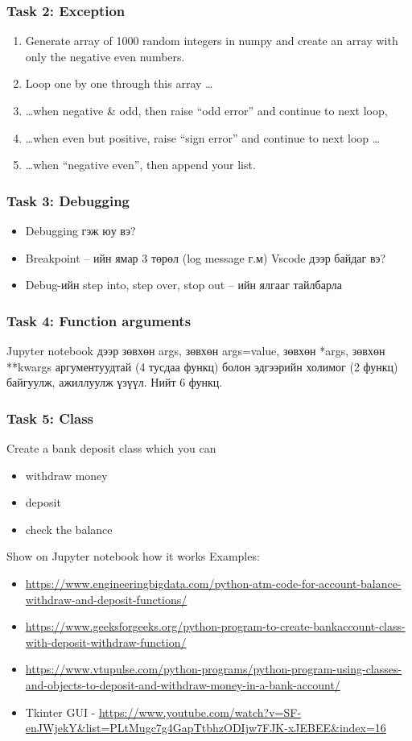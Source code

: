 \documentclass{beamer}
\begin{document}
\begin{frame}
    \frametitle{Task 2: Exception}
    \begin{enumerate}
        \item Generate array of 1000 random integers in numpy and create an array with only the negative even numbers.
        \item Loop one by one through this array …
        \item \ldots when negative & odd, then raise “odd error” and continue to next loop, 
        \item \ldots when even but positive, raise “sign error” and continue to next loop \ldots
        \item \ldots when “negative even”, then append your list. 
    \end{enumerate}
\end{frame}

\begin{frame}
    \frametitle{Task 3: Debugging}
    \begin{itemize}
        \item Debugging гэж юу вэ?
        \item Breakpoint – ийн ямар 3 төрөл (log message г.м) Vscode дээр байдаг вэ?
        \item Debug-ийн step into, step over, stop out – ийн ялгааг тайлбарла 
    \end{itemize}
\end{frame}

\begin{frame}
    \frametitle{Task 4: Function arguments}
    Jupyter notebook дээр зөвхөн args, зөвхөн args=value, зөвхөн *args, 
    зөвхөн **kwargs аргументуудтай (4 тусдаа функц) болон эдгээрийн холимог 
    (2 функц) байгуулж, ажиллуулж үзүүл. Нийт 6 функц.
\end{frame}

\begin{frame}
    \frametitle{Task 5: Class}
    Create a bank deposit class which you can 
    \begin{itemize}
        \item withdraw money
        \item deposit 
        \item check the balance
    \end{itemize}
    Show on Jupyter notebook how it works
\vskip 2mm
Examples: 
\tiny
    \begin{itemize}
        \item \url{https://www.engineeringbigdata.com/python-atm-code-for-account-balance-withdraw-and-deposit-functions/}
        \item \url{https://www.geeksforgeeks.org/python-program-to-create-bankaccount-class-with-deposit-withdraw-function/}
        \item \url{https://www.vtupulse.com/python-programs/python-program-using-classes-and-objects-to-deposit-and-withdraw-money-in-a-bank-account/}
        \item Tkinter GUI - \url{https://www.youtube.com/watch?v=SF-enJWjekY&list=PLtMugc7g4GapTtbhzODIjw7FJK-xJEBEE&index=16}
    \end{itemize}
\end{frame}
\end{document}
